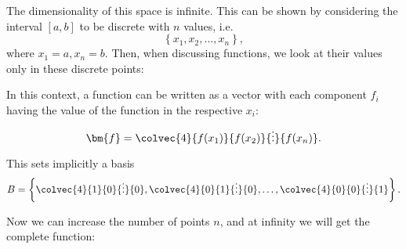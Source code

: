 The dimensionality of this space is infinite. This can be shown by considering the interval $\left[ a,b \right]$ to be discrete with $n$ values, i.e.
\begin{equation*}
  \left\{ x_{1}, x_{2}, \dots, x_{n} \right\},
\end{equation*}
where $x_{1}=a, x_{n}=b$. Then, when discussing functions, we look at their values only in these discrete points:
\begin{figure}[H]
  \centering
\end{figure}

In this context, a function can be written as a vector with each component $f_{i}$ having the value of the function in the respective $x_{i}$:
\begin{equation*}
  \bm{f}=\colvec{4}{f(x_{1})}{f(x_{2})}{\vdots}{f(x_{n})}.
\end{equation*}

This sets implicitly a basis
\begin{equation*}
  B=\left\{ \colvec{4}{1}{0}{\vdots}{0}, \colvec{4}{0}{1}{\vdots}{0}, \dots, \colvec{4}{0}{0}{\vdots}{1} \right\}.
\end{equation*}

Now we can increase the number of points $n$, and at infinity we will get the complete function:


